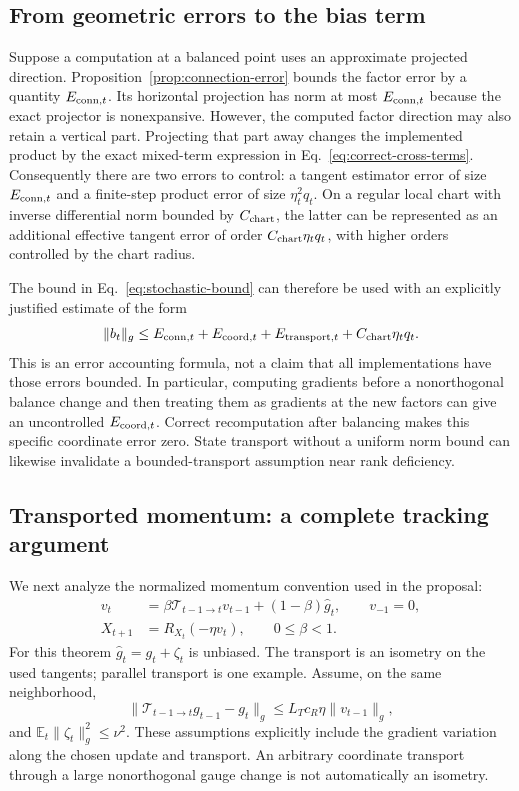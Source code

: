 \subsection{From geometric errors to the bias term}
Suppose a computation at a balanced point uses an approximate projected
direction. Proposition~\ref{prop:connection-error} bounds the factor error
by a quantity $E_{{\rm conn},t}$. Its horizontal projection has norm at
most $E_{{\rm conn},t}$ because the exact projector is nonexpansive.
However, the computed factor direction may also retain a vertical part.
Projecting that part away changes the implemented product by the exact
mixed-term expression in Eq.~\eqref{eq:correct-cross-terms}.
Consequently there are two errors to control: a tangent estimator error of
size $E_{{\rm conn},t}$ and a finite-step product error of size
$\eta_t^2q_t$. On a regular local chart with inverse differential norm
bounded by $C_{\rm chart}$, the latter can be represented as an additional
effective tangent error of order $C_{\rm chart}\eta_tq_t$, with higher
orders controlled by the chart radius.

The bound in Eq.~\eqref{eq:stochastic-bound} can therefore be used with
an explicitly justified estimate of the form
\begin{equation}
 \|b_t\|_g\leq E_{{\rm conn},t}+E_{{\rm coord},t}
       +E_{{\rm transport},t}+C_{\rm chart}\eta_tq_t.
 \label{eq:error-budget}
\end{equation}
This is an error accounting formula, not a claim that all implementations
have those errors bounded. In particular, computing gradients before a
nonorthogonal balance change and then treating them as gradients at the
new factors can give an uncontrolled $E_{{\rm coord},t}$. Correct
recomputation after balancing makes this specific coordinate error zero.
State transport without a uniform norm bound can likewise invalidate a
bounded-transport assumption near rank deficiency.

\subsection{Transported momentum: a complete tracking argument}
We next analyze the normalized momentum convention used in the proposal:
\begin{align}
 v_t&=\beta\mathcal T_{t-1\to t}v_{t-1}
          +(1-\beta)\widehat g_t,\qquad v_{-1}=0,\\
 X_{t+1}&=R_{X_t}(-\eta v_t),\qquad 0\leq\beta<1.
 \label{eq:momentum-algorithm}
\end{align}
For this theorem $\widehat g_t=g_t+\zeta_t$ is unbiased. The transport
is an isometry on the used tangents; parallel transport is one example.
Assume, on the same neighborhood,
\begin{equation}
 \|\mathcal T_{t-1\to t}g_{t-1}-g_t\|_g
       \leq L_Tc_R\eta\|v_{t-1}\|_g,
 \label{eq:transported-grad-lipschitz}
\end{equation}
and $\mathbb E_t\|\zeta_t\|_g^2\leq\nu^2$. These assumptions explicitly
include the gradient variation along the chosen update and transport.
An arbitrary coordinate transport through a large nonorthogonal gauge
change is not automatically an isometry.


